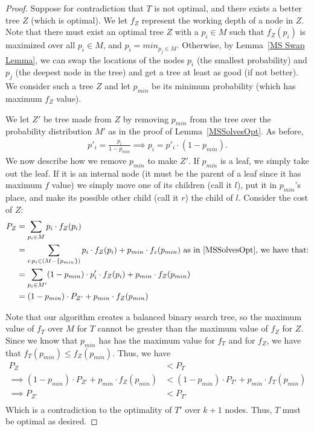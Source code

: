 \documentclass[letterpaper,12pt,titlepage,oneside,final]{book}
\theoremstyle{plain}
\begin{document}
\begin{proof}
Suppose for contradiction that $T$ is not optimal, and there exists a better tree $Z$ (which is optimal). We let $f_Z$ represent the working depth of a node in $Z$. Note that there must exist an optimal tree $Z$ with a $p_i \in M$ such that $f_Z(p_i)$ is maximized over all $p_i \in M$, and $p_i = min_{p_j \in M}$. Otherwise, by Lemma~\ref{MS Swap Lemma}, we can swap the locations of the nodes $p_i$ (the smallest probability) and $p_j$ (the deepest node in the tree) and get a tree at least as good (if not better). We consider such a tree $Z$ and let $p_{min}$ be its minimum probability (which has maximum $f_Z$ value).

We let $Z'$ be tree made from $Z$ by removing $p_{min}$ from the tree over the probability distribution $M'$ as in the proof of Lemma~\ref{MSSolvesOpt}. As before,
\begin{align*}
p'_i=\frac{p_i}{1-p_{min}} \implies p_i = p'_i\cdot (1-p_{min}).
\end{align*}
We now describe how we remove $p_{min}$ to make $Z'$. If $p_{min}$ is a leaf, we simply take out the leaf. If it is an internal node (it must be the parent of a leaf since it has maximum $f$ value) we simply move one of its children (call it $l$), put it in $p_{min}$'s place, and make its possible other child (call it $r$) the child of $l$. Consider the cost of $Z$:
\begin{align*}
P_Z &= \sum_{p_i \in M} p_i\cdot f_Z(p_i) \\
&= \sum_{i:p_i \in (M - \{p_{min}\})} p_i\cdot f_Z(p_i) + p_{min}\cdot f_z(p_{min}) \text{ as in~\ref{MSSolvesOpt}, we have that:} \\
&= \sum_{p_i \in M'} (1-p_{min})\cdot p'_i\cdot f_Z(p_i) + p_{min}\cdot f_Z(p_{min}) \\
&= (1-p_{min})\cdot P_{Z'} + p_{min}\cdot f_Z(p_{min}) \\
\end{align*}

Note that our algorithm creates a balanced binary search tree, so the maximum value of $f_T$ over $M$ for $T$ cannot be greater than the maximum value of $f_Z$ for $Z$. Since we know that $p_{min}$ has has the maximum value for $f_T$ and for $f_Z$,  we have that $f_T(p_{min}) \leq f_Z(p_{min})$. Thus, we have
\begin{align*}
P_Z &< P_T \\
\implies (1-p_{min})\cdot P_{Z'} + p_{min}\cdot f_Z(p_{min}) &< (1-p_{min})\cdot P_{T'} + p_{min}\cdot f_T(p_{min}) \\
\implies P_{Z'} &< P_{T'} \\
\end{align*}
Which is a contradiction to the optimality of $T'$ over $k+1$ nodes. Thus, $T$ must be optimal as desired.


\end{proof}
\end{document}
